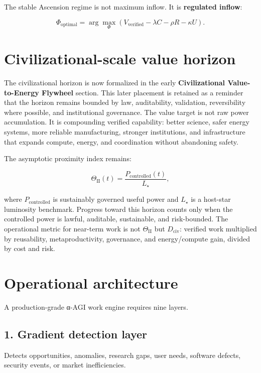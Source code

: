 The stable Ascension regime is not maximum inflow. It is
\textbf{regulated inflow}:

\[
\Phi_{\text{optimal}}
=
\arg\max_{\Phi}
\left(V_{\text{verified}}-\lambda C-\rho R-\kappa U\right).
\]

\section{Civilizational-scale value
horizon}\label{civilizational-scale-value-horizon}

The civilizational horizon is now formalized in the early
\textbf{Civilizational Value-to-Energy Flywheel} section. This later
placement is retained as a reminder that the horizon remains bounded by
law, auditability, validation, reversibility where possible, and
institutional governance. The value target is not raw power
accumulation. It is compounding verified capability: better science,
safer energy systems, more reliable manufacturing, stronger
institutions, and infrastructure that expands compute, energy, and
coordination without abandoning safety.

The asymptotic proximity index remains:

\[
\Theta_{\mathrm{II}}(t)=\frac{P_{\mathrm{controlled}}(t)}{L_{\star}},
\]

where \(P_{\mathrm{controlled}}\) is sustainably governed useful power
and \(L_{\star}\) is a host-star luminosity benchmark. Progress toward
this horizon counts only when the controlled power is lawful, auditable,
sustainable, and risk-bounded. The operational metric for near-term work
is not \(\Theta_{\mathrm{II}}\) but \(D_{\mathrm{civ}}\): verified work
multiplied by reusability, metaproductivity, governance, and
energy/compute gain, divided by cost and risk.

\section{Operational architecture}\label{operational-architecture}

A production-grade α-AGI work engine requires nine layers.

\subsection{1. Gradient detection layer}\label{gradient-detection-layer}

Detects opportunities, anomalies, research gaps, user needs, software
defects, security events, or market inefficiencies.

